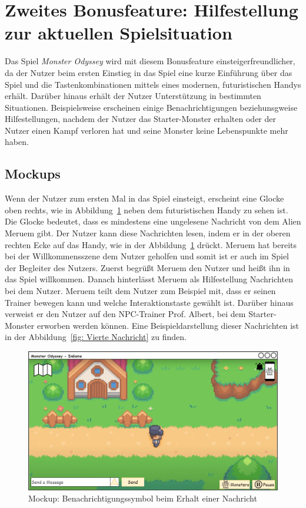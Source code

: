 \section{Zweites Bonusfeature: Hilfestellung zur aktuellen Spielsituation}\label{sec:handy-help}
Das Spiel \textit{ Monster Odyssey} wird mit diesem Bonusfeature einsteigerfreundlicher, da der Nutzer beim ersten Einstieg in das Spiel eine kurze Einführung über das Spiel und die Tastenkombinationen mittels eines modernen, futuristischen Handys erhält. Darüber hinaus erhält der Nutzer Unterstützung in bestimmten Situationen. Beispielsweise erscheinen einige Benachrichtigungen beziehunsgweise Hilfestellungen, nachdem der Nutzer das Starter-Monster erhalten oder der Nutzer einen Kampf verloren hat und seine Monster keine Lebenspunkte mehr haben.
\subsection{Mockups}\label{subsec:mockups-handy-help}
Wenn der Nutzer zum ersten Mal in das Spiel einsteigt, erscheint eine Glocke oben rechts, wie in Abbildung~\ref{fig: Benachrichtigung beim Erhalt einer Nachricht} neben dem futuristischen Handy zu sehen ist.
Die Glocke bedeutet, dass es mindestens eine ungelesene Nachricht von dem Alien Meruem gibt.
Der Nutzer kann diese Nachrichten lesen, indem er in der oberen rechten Ecke auf das Handy, wie in der Abbildung~\ref{fig: Benachrichtigung beim Erhalt einer Nachricht} drückt. 
Meruem hat bereits bei der Willkommensszene dem Nutzer geholfen und somit ist er auch im Spiel der Begleiter des Nutzers.
Zuerst begrüßt Meruem den Nutzer und heißt ihn in das Spiel willkommen.
Danach hinterlässt Meruem als Hilfestellung Nachrichten bei dem Nutzer. Meruem teilt dem Nutzer zum Beispiel mit, dass er seinen Trainer bewegen kann und welche Interaktionstaste gewählt ist. 
Darüber hinaus verweist er den Nutzer auf den NPC-Trainer Prof. Albert, bei dem Starter-Monster erworben werden können. Eine Beispieldarstellung dieser Nachrichten ist in der Abbildung~\ref{fig: Vierte Nachricht} zu finden.
\begin{figure}[H]
    \center
    \includegraphics[scale=\scale]{images/mockups/Bonusfeatures/Helpsituation/PlayerAndPlayerIngame.png}
    \caption{Mockup: Benachrichtigungssymbol beim Erhalt einer Nachricht}
    \label{fig: Benachrichtigung beim Erhalt einer Nachricht}
\end{figure}
